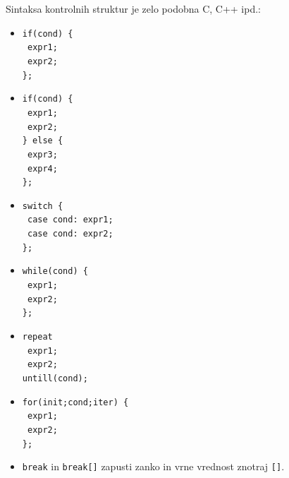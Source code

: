 \documentclass[12pt,titlepage]{report}
\newcommand{\wdot}{\textcolor{white}{.}}
\begin{document}
		Sintaksa kontrolnih struktur je zelo podobna C, C++ ipd.:
		\begin{itemize}
			\item \parbox{\textwidth}{\vspace{5px}\texttt{if(cond) \{\\\wdot\qquad expr1;\\ \wdot\qquad expr2;\\\};}\vspace{5px}}
			\item \parbox{\textwidth}{\vspace{5px}\texttt{if(cond) \{\\\wdot\qquad expr1;\\ \wdot\qquad expr2;\\\} else \{\\\wdot\qquad expr3;\\ \wdot\qquad expr4;\\\};}\vspace{5px}}
			\item \parbox{\textwidth}{\vspace{5px}\texttt{switch \{\\\wdot\qquad case cond: expr1;\\ \wdot\qquad case cond: expr2;\\\};}\vspace{5px}}
			\item \parbox{\textwidth}{\vspace{5px}\texttt{while(cond) \{\\\wdot\qquad expr1;\\ \wdot\qquad expr2;\\\};}\vspace{5px}}
			\item \parbox{\textwidth}{\vspace{5px}\texttt{repeat \\\wdot\qquad expr1;\\ \wdot\qquad expr2;\\ untill(cond);}\vspace{5px}}
			\item \parbox{\textwidth}{\vspace{5px}\texttt{for(init;cond;iter) \{\\\wdot\qquad expr1;\\ \wdot\qquad expr2;\\\};}\vspace{5px}}
			\item \texttt{break} in \texttt{break[]} zapusti zanko in vrne vrednost znotraj \texttt{[]}.

\end{itemize}
\end{document}
